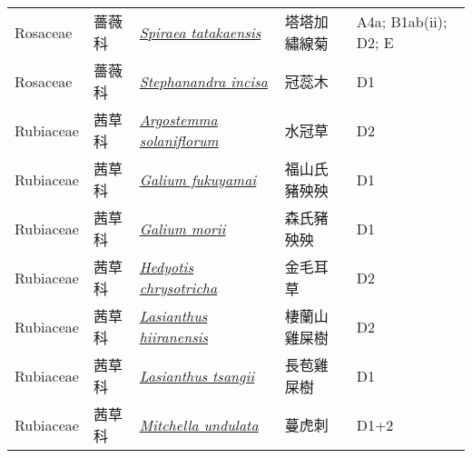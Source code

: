 {\begin{longtable}{L{2.5cm}L{2cm}L{5cm}L{2.5cm}L{3cm}}
    Rosaceae & 薔薇科 & \href{http://www.theplantlist.org/tpl1.1/search?q=Spiraea+tatakaensis}{\textit{Spiraea tatakaensis} } & 塔塔加繡線菊 & A4a; B1ab(ii); D2; E    \\
    Rosaceae & 薔薇科 & \href{http://www.theplantlist.org/tpl1.1/search?q=Stephanandra+incisa}{\textit{Stephanandra incisa} } & 冠蕊木 & D1    \\
    Rubiaceae & 茜草科 & \href{http://www.theplantlist.org/tpl1.1/search?q=Argostemma+solaniflorum}{\textit{Argostemma solaniflorum} } & 水冠草 & D2    \\
    Rubiaceae & 茜草科 & \href{http://www.theplantlist.org/tpl1.1/search?q=Galium+fukuyamai}{\textit{Galium fukuyamai} } & 福山氏豬殃殃 & D1    \\
    Rubiaceae & 茜草科 & \href{http://www.theplantlist.org/tpl1.1/search?q=Galium+morii}{\textit{Galium morii} } & 森氏豬殃殃 & D1    \\
    Rubiaceae & 茜草科 & \href{http://www.theplantlist.org/tpl1.1/search?q=Hedyotis+chrysotricha}{\textit{Hedyotis chrysotricha} } & 金毛耳草 & D2    \\
    Rubiaceae & 茜草科 & \href{http://www.theplantlist.org/tpl1.1/search?q=Lasianthus+hiiranensis}{\textit{Lasianthus hiiranensis} } & 棲蘭山雞屎樹 & D2    \\
    Rubiaceae & 茜草科 & \href{http://www.theplantlist.org/tpl1.1/search?q=Lasianthus+tsangii}{\textit{Lasianthus tsangii} } & 長苞雞屎樹 & D1    \\
    Rubiaceae & 茜草科 & \href{http://www.theplantlist.org/tpl1.1/search?q=Mitchella+undulata}{\textit{Mitchella undulata} } & 蔓虎刺 & D1+2    \\

\end{longtable}}
